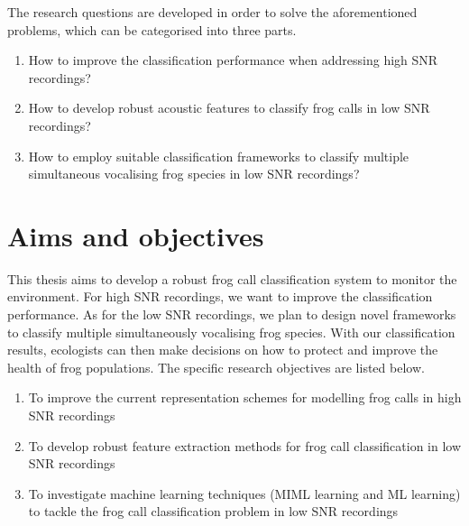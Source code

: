 The research questions are developed in order to solve the aforementioned problems, which can be categorised into three parts. 

\begin{enumerate}
 \item How to improve the classification performance when addressing high SNR recordings?
 
\item How to develop robust acoustic features to classify frog calls in low SNR recordings?

\item How to employ suitable classification frameworks to classify multiple simultaneous vocalising frog species in low SNR recordings?
 
\end{enumerate}




\section{Aims and objectives}
This thesis aims to develop a robust frog call classification system to monitor the environment. For high SNR recordings, we want to improve the classification performance. As for the low SNR recordings, we plan to design novel frameworks to classify multiple simultaneously vocalising frog species. With our classification results, ecologists can then make decisions on how to protect and improve the health of frog populations. The specific research objectives are listed below.


\begin{enumerate}

\item	To improve the current representation schemes for modelling frog calls in high SNR recordings

\item 	To develop robust feature extraction methods for frog call classification in low SNR recordings 

\item   To investigate machine learning techniques (MIML learning and ML learning) to tackle the frog call classification problem in low SNR recordings

\end{enumerate}
 
 
 
